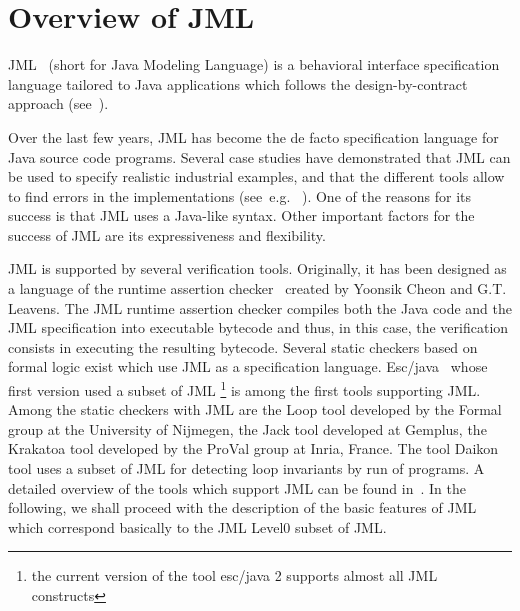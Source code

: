 


\section{Overview of JML} \label{BCSLprelim}
JML~\cite{JMLRefMan} (short for Java Modeling Language) is a behavioral interface specification 
language tailored to Java applications which follows the design-by-contract approach (see~\cite{M97oos}).

Over the last few years, JML has become the de facto specification language for
 Java source code programs. Several case studies have demonstrated that JML can be used to specify realistic
industrial examples, and that the different tools allow to find errors
in the implementations (see~e.g. \/~\cite{BreunesseCHJ04}). One
of the reasons for its success is that JML uses a Java-like
syntax.  Other important factors for the success of JML are its expressiveness and
flexibility.

JML is supported by several verification tools.
 Originally, it has been designed as a language of the runtime assertion checker~\cite{jmlrac} created by Yoonsik Cheon and G.T. Leavens. 
The JML runtime assertion checker compiles both the Java code and the JML specification into executable bytecode and thus, 
in this case, the verification consists in executing the resulting bytecode. Several static checkers based 
on formal logic exist which use JML as a specification language. Esc/java~\cite{escjava}  whose first version used a subset 
 of JML \footnote{the current version of the tool esc/java 2  supports almost all JML constructs} is among the first tools supporting JML.
Among the static checkers with JML  are
the Loop tool developed by the Formal group at the University of Nijmegen,
the Jack tool developed at Gemplus, the Krakatoa tool developed by the ProVal group at Inria, France.
The tool Daikon \cite{ECG01DDL}  tool uses a subset of JML for detecting loop invariants by run of programs.
 A  detailed overview of the tools which support JML can  be found in~\cite{BurdyCCEKLLP03}.
In the following, we shall proceed with the description of the basic features of JML which correspond basically to the
JML Level0 subset of JML. 


